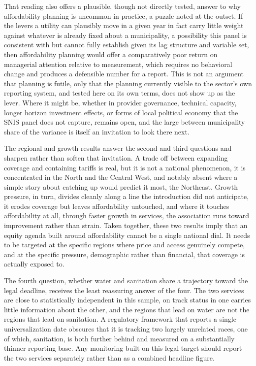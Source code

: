 \documentclass[pdflatex,sn-mathphys-num]{sn-jnl}%
\theoremstyle{thmstyleone}%
\theoremstyle{thmstyletwo}%
\theoremstyle{thmstylethree}%
\begin{document}
That reading also offers a plausible, though not directly tested, answer to why affordability planning is uncommon in practice, a puzzle noted at the outset. If the levers a utility can plausibly move in a given year in fact carry little weight against whatever is already fixed about a municipality, a possibility this panel is consistent with but cannot fully establish given its lag structure and variable set, then affordability planning would offer a comparatively poor return on managerial attention relative to measurement, which requires no behavioral change and produces a defensible number for a report. This is not an argument that planning is futile, only that the planning currently visible to the sector's own reporting system, and tested here on its own terms, does not show up as the lever. Where it might be, whether in provider governance, technical capacity, longer horizon investment effects, or forms of local political economy that the SNIS panel does not capture, remains open, and the large between municipality share of the variance is itself an invitation to look there next.

The regional and growth results answer the second and third questions and sharpen rather than soften that invitation. A trade off between expanding coverage and containing tariffs is real, but it is not a national phenomenon, it is concentrated in the North and the Central West, and notably absent where a simple story about catching up would predict it most, the Northeast. Growth pressure, in turn, divides cleanly along a line the introduction did not anticipate, it erodes coverage but leaves affordability untouched, and where it touches affordability at all, through faster growth in services, the association runs toward improvement rather than strain. Taken together, these two results imply that an equity agenda built around affordability cannot be a single national dial. It needs to be targeted at the specific regions where price and access genuinely compete, and at the specific pressure, demographic rather than financial, that coverage is actually exposed to.

The fourth question, whether water and sanitation share a trajectory toward the legal deadline, receives the least reassuring answer of the four. The two services are close to statistically independent in this sample, on track status in one carries little information about the other, and the regions that lead on water are not the regions that lead on sanitation. A regulatory framework that reports a single universalization date obscures that it is tracking two largely unrelated races, one of which, sanitation, is both further behind and measured on a substantially thinner reporting base. Any monitoring built on this legal target should report the two services separately rather than as a combined headline figure.
\end{document}
